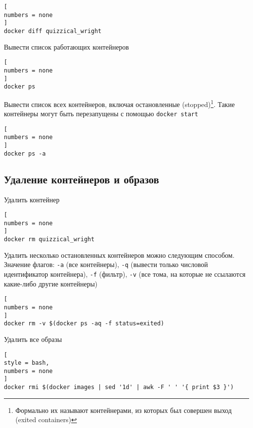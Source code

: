 \documentclass[%
	11pt,
	a4paper,
	utf8,
		]{article}
\begin{document}
\begin{lstlisting}[
numbers = none
]
docker diff quizzical_wright
\end{lstlisting}

Вывести список работающих контейнеров

\begin{lstlisting}[
numbers = none
]
docker ps
\end{lstlisting}

Вывести список всех контейнеров, включая остановленные (stopped)\footnote{Формально их называют контейнерами, из которых был совершен выход (exited containers)}. Такие контейнеры могут быть перезапущены с помощью \texttt{docker start}

\begin{lstlisting}[
numbers = none
]
docker ps -a
\end{lstlisting}

\subsection{Удаление контейнеров и образов}

Удалить контейнер 

\begin{lstlisting}[
numbers = none
]
docker rm quizzical_wright
\end{lstlisting}

Удалить несколько остановленных контейнеров можно следующим способом. Значение флагов: \texttt{-a} (все контейнеры), \texttt{-q} (вывести только числовой идентификатор контейнера), \texttt{-f} (фильтр), \texttt{-v} (все тома, на которые не ссылаются какие-либо другие контейнеры)

\begin{lstlisting}[
numbers = none
]
docker rm -v $(docker ps -aq -f status=exited)
\end{lstlisting}

Удалить все образы 
\begin{lstlisting}[
style = bash,
numbers = none
]
docker rmi $(docker images | sed '1d' | awk -F ' ' '{ print $3 }')
\end{lstlisting}


\begin{thebibliography}{99}
	
	
\end{thebibliography}

\end{document}
